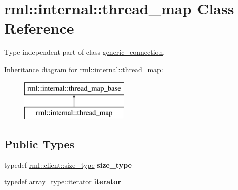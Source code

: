 \hypertarget{classrml_1_1internal_1_1thread__map}{}\section{rml\+:\+:internal\+:\+:thread\+\_\+map Class Reference}
\label{classrml_1_1internal_1_1thread__map}


Type-\/independent part of class \hyperlink{classrml_1_1internal_1_1generic__connection}{generic\+\_\+connection}.  


Inheritance diagram for rml\+:\+:internal\+:\+:thread\+\_\+map\+:\begin{figure}[H]
\begin{center}
\leavevmode
\includegraphics[height=2.000000cm]{classrml_1_1internal_1_1thread__map}
\end{center}
\end{figure}
\subsection*{Public Types}
\begin{DoxyCompactItemize}
\item 
\hypertarget{classrml_1_1internal_1_1thread__map_a48090762785b094c42d9a4ab72ab62af}{}typedef \hyperlink{classrml_1_1client_a0dc06ede570f7ee6d3021862cb71119f}{rml\+::client\+::size\+\_\+type} {\bfseries size\+\_\+type}\label{classrml_1_1internal_1_1thread__map_a48090762785b094c42d9a4ab72ab62af}

\item 
\hypertarget{classrml_1_1internal_1_1thread__map_a6973b16d669a79bad45ac3a577bc8183}{}typedef array\+\_\+type\+::iterator {\bfseries iterator}\label{classrml_1_1internal_1_1thread__map_a6973b16d669a79bad45ac3a577bc8183}

\end{DoxyCompactItemize}
